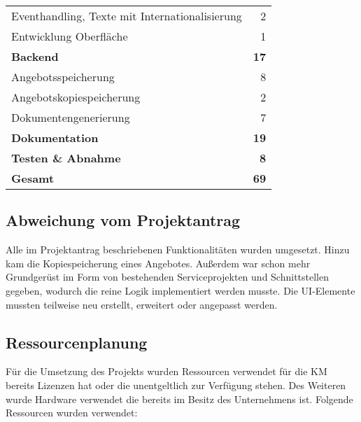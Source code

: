 {\begin{tabular}{|l|r|}
	Eventhandling, Texte mit Internationalisierung            &                        2 \\
		Entwicklung Oberfläche                                    &                        1 \\
	\textbf{Backend  }                                        &             \textbf{ 17} \\
	Angebotsspeicherung                                       &                        8 \\
	Angebotskopiespeicherung                                  &                        2 \\
	Dokumentengenerierung                                     &                        7 \\
	\textbf{Dokumentation }                                   &             \textbf{ 19} \\
	\textbf{Testen \& Abnahme }                               &              \textbf{ 8} \\ \hline
	\textbf{	Gesamt    }                                      &             \textbf{ 69} \\ \hline
\end{tabular}


\subsection{Abweichung vom Projektantrag}
\label{abweichung}
Alle im Projektantrag beschriebenen Funktionalitäten wurden umgesetzt. Hinzu kam die Kopiespeicherung eines Angebotes. Außerdem war schon mehr Grundgerüst im Form von bestehenden Serviceprojekten und Schnittstellen gegeben, wodurch die reine Logik implementiert werden musste. Die UI-Elemente mussten teilweise neu erstellt, erweitert oder angepasst werden.
\subsection{Ressourcenplanung}
\label{ressourcenplanung}
Für die Umsetzung des Projekts wurden Ressourcen verwendet für die \ac{KM} bereits Lizenzen hat oder die unentgeltlich zur Verfügung stehen. Des Weiteren wurde Hardware verwendet die bereits im Besitz des Unternehmens ist.
Folgende Ressourcen wurden verwendet:

}
